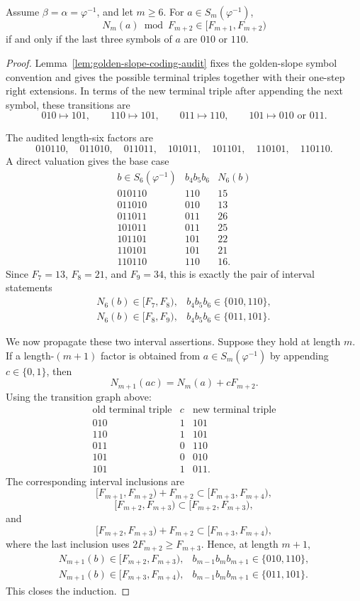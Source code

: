 \begin{lemma}
\label{lem:golden-terminal-residue-skeleton}
Assume \(\beta=\alpha=\varphi^{-1}\), and let \(m\ge6\).  For
\(a\in S_m(\varphi^{-1})\),
\[
N_m(a)\bmod F_{m+2}\in [F_{m+1},F_{m+2})
\]
if and only if the last three symbols of \(a\) are \(010\) or \(110\).
\end{lemma}

\begin{proof}
Lemma~\ref{lem:golden-slope-coding-audit} fixes the golden-slope symbol
convention and gives the possible terminal triples together with their
one-step right extensions.  In terms of the new terminal triple after appending
the next symbol, these transitions are
\[
010\mapsto 101,\qquad
110\mapsto 101,\qquad
011\mapsto 110,\qquad
101\mapsto 010\text{ or }011 .
\]

The audited length-six factors are
\[
010110,\quad 011010,\quad 011011,\quad 101011,\quad 101101,\quad 110101,
\quad 110110 .
\]
A direct valuation gives the base case
\[
\begin{array}{c|c|c}
b\in S_6(\varphi^{-1}) & b_4b_5b_6 & N_6(b)\\
\hline
010110&110&15\\
011010&010&13\\
011011&011&26\\
101011&011&25\\
101101&101&22\\
110101&101&21\\
110110&110&16 .
\end{array}
\]
Since \(F_7=13\), \(F_8=21\), and \(F_9=34\), this is exactly the pair of
interval statements
\[
\begin{array}{ll}
N_6(b)\in[F_7,F_8), & b_4b_5b_6\in\{010,110\},\\
N_6(b)\in[F_8,F_9), & b_4b_5b_6\in\{011,101\}.
\end{array}
\]

We now propagate these two interval assertions.  Suppose they hold at length
\(m\).  If a length-\((m+1)\) factor is obtained from \(a\in S_m(\varphi^{-1})\)
by appending \(c\in\{0,1\}\), then
\[
N_{m+1}(ac)=N_m(a)+cF_{m+2}.
\]
Using the transition graph above:
\[
\begin{array}{c|c|c}
\text{old terminal triple} & c & \text{new terminal triple}\\
\hline
010&1&101\\
110&1&101\\
011&0&110\\
101&0&010\\
101&1&011 .
\end{array}
\]
The corresponding interval inclusions are
\[
[F_{m+1},F_{m+2})+F_{m+2}\subset [F_{m+3},F_{m+4}),
\]
\[
[F_{m+2},F_{m+3})\subset [F_{m+2},F_{m+3}),
\]
and
\[
[F_{m+2},F_{m+3})+F_{m+2}\subset [F_{m+3},F_{m+4}),
\]
where the last inclusion uses \(2F_{m+2}\ge F_{m+3}\).  Hence, at length
\(m+1\),
\[
\begin{array}{ll}
N_{m+1}(b)\in[F_{m+2},F_{m+3}), & b_{m-1}b_mb_{m+1}\in\{010,110\},\\
N_{m+1}(b)\in[F_{m+3},F_{m+4}), & b_{m-1}b_mb_{m+1}\in\{011,101\}.
\end{array}
\]
This closes the induction.


\end{proof}
